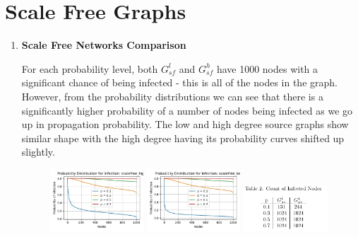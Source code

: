 \documentclass[letterpaper,9pt]{article}
\begin{document}
\section{Scale Free Graphs}
\begin{enumerate}
    \item \textbf{Scale Free Networks Comparison}

        For each probability level, both $G^{l}_{sf}$ and $G^{h}_{sf}$ have 
        1000 nodes with a significant chance of being infected - this is all of 
        the nodes in the graph. However, from the probability distributions 
        we can see that there is a significantly higher probability of a number
        of nodes being infected as we go up in propagation probability. The low
        and high degree source graphs show similar shape with the high degree
        having its probability curves shifted up slightly. 

    \begin{figure}[htpb]
        \centering
        \includegraphics[width=0.33\textwidth]{pdist_scalefree_high.jpg}
        \includegraphics[width=0.33\textwidth]{pdist_scalefree_low.jpg}\hfill
        \includegraphics[width=0.3\textwidth]{tab2.png}
    \end{figure} 


\end{enumerate}



\end{document}
